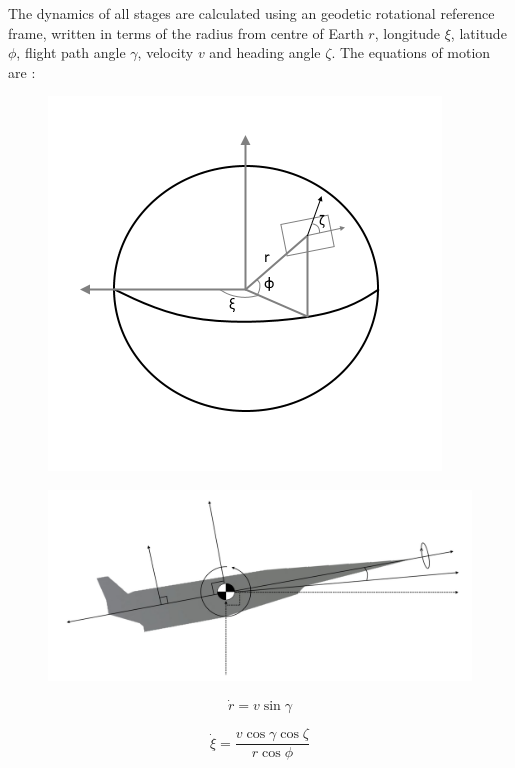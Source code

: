 The dynamics of all stages are calculated using an geodetic rotational reference frame, written in terms of the radius from centre of Earth $r$, longitude $\xi$, latitude $\phi$, flight path angle $\gamma$, velocity $v$ and heading angle $\zeta$. The equations of motion are \cite{Josselyn2002a}:
\begin{figure}
\centering
\includegraphics[width=0.7\linewidth]{figures/4_LODESTAR/global}
\caption{}
\label{fig:global}
\end{figure}
\begin{figure}
\centering
\includegraphics[width=0.9\linewidth]{figures/4_LODESTAR/Axes}
\caption{}
\label{fig:Axes}
\end{figure}


\begin{equation}
\dot{r} = v \sin \gamma
\end{equation}

\begin{equation}
\dot{\xi} = \frac{v\cos \gamma \cos \zeta}{r \cos \phi}
\end{equation}

